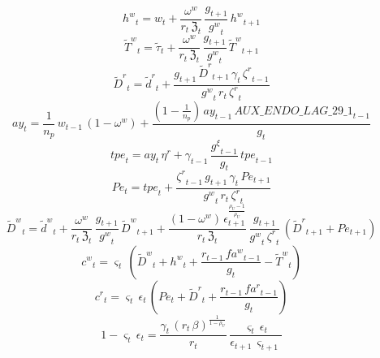 \begin{dmath}
{{h^w}}_{t}={{w}}_{t}+\frac{{{\omega^w}}}{{{r}}_{t}\, {{\mathfrak{Z}}}_{t}}\, \frac{{{g}}_{t+1}}{{{g^w}}_{t}}\, {{h^w}}_{t+1}
\end{dmath}
\begin{dmath}
{{\tilde{T}^w}}_{t}={\tilde{\tau}}_{t}+\frac{{{\omega^w}}}{{{r}}_{t}\, {{\mathfrak{Z}}}_{t}}\, \frac{{{g}}_{t+1}}{{{g^w}}_{t}}\, {{\tilde{T}^w}}_{t+1}
\end{dmath}
\begin{dmath}
{\tilde{D}^r}_{t}={\tilde{d}^r}_{t}+\frac{{{g}}_{t+1}\, {\tilde{D}^r}_{t+1}\, {{\gamma}}_{t}\, {{\zeta^{r}}}_{t-1}}{{{g^w}}_{t}\, {{r}}_{t}\, {{\zeta^{r}}}_{t}}
\end{dmath}
\begin{dmath}
{{ay}}_{t}=\frac{1}{{{n_p}}}\, {{w}}_{t-1}\, \left(1-{{\omega^w}}\right)+\frac{\left(1-\frac{1}{{{n_p}}}\right)\, {{ay}}_{t-1}\, {AUX\_ENDO\_LAG\_29\_1}_{t-1}}{{{g}}_{t}}
\end{dmath}
\begin{dmath}
{{tpe}}_{t}={{ay}}_{t}\, {{\eta^r}}+{{\gamma}}_{t-1}\, \frac{{{g^{\xi}}}_{t-1}}{{{g}}_{t}}\, {{tpe}}_{t-1}
\end{dmath}
\begin{dmath}
{{Pe}}_{t}={{tpe}}_{t}+\frac{{{\zeta^{r}}}_{t-1}\, {{g}}_{t+1}\, {{\gamma}}_{t}\, {{Pe}}_{t+1}}{{{g^w}}_{t}\, {{r}}_{t}\, {{\zeta^{r}}}_{t}}
\end{dmath}
\begin{dmath}
{\tilde{D}^w}_{t}={\tilde{d}^w}_{t}+\frac{{{\omega^w}}}{{{r}}_{t}\, {{\mathfrak{Z}}}_{t}}\, \frac{{{g}}_{t+1}}{{{g^w}}_{t}}\, {\tilde{D}^w}_{t+1}+\frac{\left(1-{{\omega^w}}\right)\, {{\epsilon}}_{t+1}^{\frac{{{\rho_U}}-1}{{{\rho_U}}}}}{{{r}}_{t}\, {{\mathfrak{Z}}}_{t}}\, \frac{{{g}}_{t+1}}{{{g^w}}_{t}\, {{\zeta^{r}}}_{t}}\, \left({\tilde{D}^r}_{t+1}+{{Pe}}_{t+1}\right)
\end{dmath}
\begin{dmath}
{{c^w}}_{t}={{\varsigma}}_{t}\, \left({\tilde{D}^w}_{t}+{{h^w}}_{t}+\frac{{{r}}_{t-1}\, {{fa^w}}_{t-1}}{{{g}}_{t}}-{{\tilde{T}^w}}_{t}\right)
\end{dmath}
\begin{dmath}
{{c^r}}_{t}={{\varsigma}}_{t}\, {{\epsilon}}_{t}\, \left({{Pe}}_{t}+{\tilde{D}^r}_{t}+\frac{{{r}}_{t-1}\, {{fa^r}}_{t-1}}{{{g}}_{t}}\right)
\end{dmath}
\begin{dmath}
1-{{\varsigma}}_{t}\, {{\epsilon}}_{t}=\frac{{{\gamma}}_{t}\, \left({{r}}_{t}\, {{\beta}}\right)^{\frac{1}{1-{{\rho_U}}}}}{{{r}}_{t}}\, \frac{{{\varsigma}}_{t}\, {{\epsilon}}_{t}}{{{\epsilon}}_{t+1}\, {{\varsigma}}_{t+1}}
\end{dmath}

